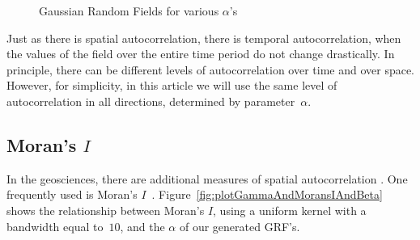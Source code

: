 \documentclass[ijgi,article,submit,moreauthors,pdftex,10pt,a4paper]{Definitions/mdpi}
\begin{document}
\begin{figure}[H]
\hspace{8mm}
\caption{Gaussian Random Fields for various $\alpha$'s}
\label{fig:GaussianRandomField}
\end{figure}

Just as there is spatial autocorrelation, there is temporal autocorrelation, when the values of the field over the entire time period do not change drastically. In principle, there can be different levels of autocorrelation over time and over space. However, for simplicity, in this article we will use the same level of autocorrelation in all directions, determined by parameter~$\alpha$.

\subsection{Moran's $I$}
\label{sec:Autocorrelation/ Morans I}
In the geosciences, there are additional measures of spatial autocorrelation \cite{Eshel2011, Storch1999}. One frequently used is Moran's $I$~\cite{Moran1950, Hubert1981, PySAL}. Figure~\ref{fig:plotGammaAndMoransIAndBeta} shows the relationship between Moran's $I$, using a uniform kernel with a bandwidth equal to~$10$, and the $\alpha$ of our generated GRF's.
\end{document}
